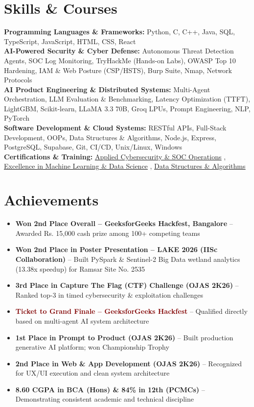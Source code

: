 \documentclass[letterpaper,10pt]{article}
\newcommand{\resumeItem}[1]{
  \item\small{
    {#1 \vspace{-1.5pt}}
  }
}
\newcommand{\resumeSubHeadingListStart}{\begin{itemize}[leftmargin=0.15in, label={}]}
\newcommand{\resumeSubHeadingListEnd}{\end{itemize}}
\begin{document}
\section{Skills \& Courses}
 \begin{itemize}[leftmargin=0.15in, label={}]
    \small{\item{
     \textbf{Programming Languages \& Frameworks:} Python, C, C++, Java, SQL, TypeScript, JavaScript, HTML, CSS, React \\
     \textbf{AI-Powered Security \& Cyber Defense:} Autonomous Threat Detection Agents, SOC Log Monitoring, TryHackMe (Hands-on Labs), OWASP Top 10 Hardening, IAM \& Web Posture (CSP/HSTS), Burp Suite, Nmap, Network Protocols \\
     \textbf{AI Product Engineering \& Distributed Systems:} Multi-Agent Orchestration, LLM Evaluation \& Benchmarking, Latency Optimization (TTFT), LightGBM, Scikit-learn, LLaMA 3.3 70B, Groq LPUs, Prompt Engineering, NLP, PyTorch \\
     \textbf{Software Development \& Cloud Systems:} RESTful APIs, Full-Stack Development, OOPs, Data Structures \& Algorithms, Node.js, Express, PostgreSQL, Supabase, Git, CI/CD, Unix/Linux, Windows \\
     \textbf{Certifications \& Training:} \href{https://cyzenai.netlify.app}{\underline{Applied Cybersecurity \& SOC Operations}} , \href{https://meet-ibrahim.vercel.app}{\underline{Excellence in Machine Learning \& Data Science}} , \href{https://github.com/MDIbrahim08}{\underline{Data Structures \& Algorithms}}
    }}
 \end{itemize}


\section{Achievements}
  \resumeSubHeadingListStart
    \resumeItem{\textbf{Won 2nd Place Overall -- GeeksforGeeks Hackfest, Bangalore} -- Awarded Rs. 15,000 cash prize among 100+ competing teams}
    \resumeItem{\textbf{Won 2nd Place in Poster Presentation -- LAKE 2026 (IISc Collaboration)} -- Built PySpark \& Sentinel-2 Big Data wetland analytics (13.38x speedup) for Ramsar Site No. 2535}
    \resumeItem{\textbf{3rd Place in Capture The Flag (CTF) Challenge (OJAS 2K26)} -- Ranked top-3 in timed cybersecurity \& exploitation challenges}
    \resumeItem{\textbf{\textcolor{Maroon}{Ticket to Grand Finale -- GeeksforGeeks Hackfest}} -- Qualified directly based on multi-agent AI system architecture}
    \resumeItem{\textbf{1st Place in Prompt to Product (OJAS 2K26)} -- Built production generative AI platform; won Championship Trophy}
    \resumeItem{\textbf{2nd Place in Web \& App Development (OJAS 2K26)} -- Recognized for UX/UI execution and clean system architecture}
    \resumeItem{\textbf{8.60 CGPA in BCA (Hons) \& 84\% in 12th (PCMCs)} -- Demonstrating consistent academic and technical discipline}
  \resumeSubHeadingListEnd

\end{document}
